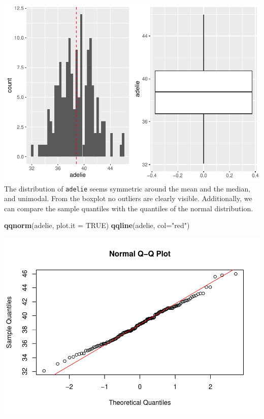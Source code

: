\documentclass[
]{article}
\newenvironment{Shaded}{\begin{snugshade}}{\end{snugshade}}
\newcommand{\AttributeTok}[1]{\textcolor[rgb]{0.13,0.29,0.53}{#1}}
\newcommand{\ConstantTok}[1]{\textcolor[rgb]{0.56,0.35,0.01}{#1}}
\newcommand{\FunctionTok}[1]{\textcolor[rgb]{0.13,0.29,0.53}{\textbf{#1}}}
\newcommand{\NormalTok}[1]{#1}
\newcommand{\StringTok}[1]{\textcolor[rgb]{0.31,0.60,0.02}{#1}}
\begin{document}
\includegraphics{Tests_and_Applications_files/figure-latex/unnamed-chunk-5-1.pdf}
The distribution of \texttt{adelie} seems symmetric around the mean and
the median, and unimodal. From the boxplot no outliers are clearly
visible. Additionally, we can compare the sample quantiles with the
quantiles of the normal distribution.

\begin{Shaded}
\begin{Highlighting}[]
\FunctionTok{qqnorm}\NormalTok{(adelie, }\AttributeTok{plot.it =} \ConstantTok{TRUE}\NormalTok{)}
\FunctionTok{qqline}\NormalTok{(adelie, }\AttributeTok{col=}\StringTok{"red"}\NormalTok{)}
\end{Highlighting}
\end{Shaded}

\includegraphics{Tests_and_Applications_files/figure-latex/unnamed-chunk-6-1.pdf}
\end{document}
